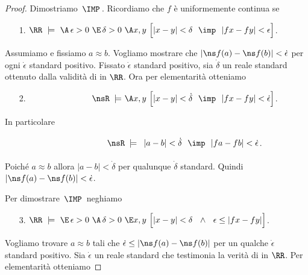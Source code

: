 \begin{proof}
Dimostriamo \,$\IMP$\,. Ricordiamo che $f$ \`e uniformemente continua se 

\begin{itemize}
\item[1.]\hspace*{9ex}$\RR\ \models\ \A\,\epsilon>0\ \E\,\delta>0\ \A x, y\ \Big[|x-y|<\delta\ \ \imp\ \ |fx-fy|<\epsilon\Big]$.
\end{itemize}

Assumiamo  e fissiamo $a\approx b$. Vogliamo mostrare che $|\ns f(a)-\ns f(b)|<\dot\epsilon$ per ogni $\dot\epsilon$ standard positivo. Fissato $\dot\epsilon$ standard positivo, sia $\dot\delta$ un reale standard ottenuto dalla validit\`a di  in $\RR$. Ora per elementarit\`a otteniamo

\begin{itemize}
\item[2.]\hspace*{9ex}$\phantom{\RR\ \models\ \A\,\epsilon>0\ \E\,\delta>0}\llap{$\nsR\;\models$}\ \A x, y\ \Big[|x-y|<\dot\delta\ \ \imp\ \ |fx-fy|<\dot\epsilon\Big]$.
\end{itemize}

In particolare 

\begin{itemize}
\item[]\hspace*{9ex}$\phantom{\RR\ \models\ \A\,\epsilon>0\ \E\,\delta>0\ \A x, y}\llap{$\nsR\;\models$}\ \phantom{\Big[}|a-b|<\dot\delta\ \ \imp\ \ |fa-fb|<\dot\epsilon$.
\end{itemize}

Poich\'e $a\approx b$ allora $|a-b|<\dot\delta$ per qualunque $\dot\delta$ standard. Quindi $|\ns f(a)-\ns f(b)|<\dot\epsilon$.

Per dimostrare \,$\IMP$\, neghiamo 

\begin{itemize}
\item[3.]\hspace*{9ex}$\RR\ \models\ \E\,\epsilon>0\ \A\,\delta>0\ \E x, y\ \Big[|x-y|<\delta\ \ \wedge\ \ \epsilon\le|fx-fy|\Big]$.
\end{itemize}

Vogliamo trovare $a\approx b$ tali che $\dot\epsilon\le|\ns f(a)-\ns f(b)|$ per un qualche $\dot\epsilon$ standard positivo. Sia $\dot\epsilon$ un reale standard che testimonia la verit\`a di  in $\RR$. Per elementarit\`a otteniamo 


\end{proof}
